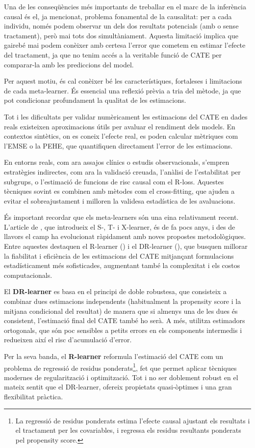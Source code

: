 \documentclass[../main.tex]{subfiles}
\begin{document}
Una de les conseqüències més importants de treballar en el marc de la inferència causal és el, ja mencionat, problema fonamental de la causalitat: per a cada individu, només podem observar un dels dos resultats potencials (amb o sense tractament), però mai tots dos simultàniament. Aquesta limitació implica que gairebé mai podem conèixer amb certesa l’error que cometem en estimar l’efecte del tractament, ja que no tenim accés a la veritable funció de CATE per comparar-la amb les prediccions del model.\par
Per aquest motiu, és cal conèixer bé les característiques, fortaleses i limitacions de cada meta-learner. És essencial una reflexió prèvia a tria del mètode, ja que pot condicionar profundament la qualitat de les estimacions.\par
Tot i les dificultats per validar numèricament les estimacions del CATE en dades reals existeixen aproximacions útils per avaluar el rendiment dels models. En contextos sintètics, on es coneix l'efecte real, es poden calcular mètriques com l’EMSE o la PEHE, que quantifiquen directament l’error de les estimacions.\par
En entorns reals, com ara assajos clínics o estudis observacionals, s’empren estratègies indirectes, com ara la validació creuada, l’anàlisi de l’estabilitat per subgrups, o l’estimació de funcions de risc causal com el R-loss. Aquestes tècniques sovint es combinen amb mètodes com el cross-fitting, que ajuden a evitar el sobreajustament i milloren la validesa estadística de les avaluacions.\par

És important recordar que els meta-learners són una eina relativament recent. L’article de \cite{kunzel2019}, que introdueix el S-, T- i X-learner, és de fa pocs anys, i des de llavors el camp ha evolucionat ràpidament amb noves propostes metodològiques. Entre aquestes destaquen el R-learner (\cite{nie2021r}) i el DR-learner (\cite{kennedy2020dr}), que busquen millorar la fiabilitat i eficiència de les estimacions del CATE mitjançant formulacions estadísticament més sofisticades, augmentant també la complexitat i els costos computacionals.\par
El \textbf{DR-learner} es basa en el principi de doble robustesa, que consisteix a combinar dues estimacions independents (habitualment la propensity score i la mitjana condicional del resultat) de manera que si almenys una de les dues és consistent, l’estimació final del CATE també ho serà. A més, utilitza estimadors ortogonals, que són poc sensibles a petits errors en els components intermedis i redueixen així el risc d’acumulació d’error.\par
Per la seva banda, el \textbf{R-learner} reformula l’estimació del CATE com un problema de regressió de residus ponderats\footnote{La regressió de residus ponderats estima l’efecte causal ajustant els resultats i el tractament per les covariables, i regressa els residus resultants ponderats pel propensity score.}, fet que permet aplicar tècniques modernes de regularització i optimització. Tot i no ser doblement robust en el mateix sentit que el DR-learner, ofereix propietats quasi-òptimes i una gran flexibilitat pràctica.\par
\end{document}
